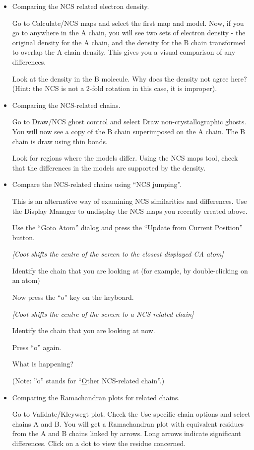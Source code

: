 \documentclass{article}
\begin{document}
\begin{itemize}
\item Comparing the NCS related electron density.

Go to \textsf{Calculate/NCS maps} and select the first map and
model. Now, if you go to anywhere in the A chain, you will see two
sets of electron density - the original density for the A chain, and
the density for the B chain transformed to overlap the A chain
density. This gives you a visual comparison of any differences.

Look at the density in the B molecule. Why does the density not agree
here? (Hint: the NCS is not a 2-fold rotation in this case, it is
improper).

\item Comparing the NCS-related chains.

  Go to \textsf{Draw/NCS ghost control} and select \textsf{Draw
    non-crystallographic ghosts}. You will now see a copy of the B
  chain superimposed on the A chain. The B chain is draw using thin
  bonds.

  Look for regions where the models differ. Using the \textsf{NCS
    maps} tool, check that the differences in the models are supported
  by the density.

\item Compare the NCS-related chains using ``NCS jumping''.

  This is an alternative way of examining NCS similarities and
  differences.  Use the Display Manager to undisplay the NCS maps you
  recently created above.  

  Use the ``Goto Atom'' dialog and press the ``Update from Current
  Position'' button.  

  \textsl{ [Coot shifts the centre of the screen to the closest
    displayed CA atom]}

  Identify the chain that you are looking at (for example, by
  double-clicking on an atom)

  Now press the ``o'' key on the keyboard.

  \textsl{ [Coot shifts the centre of the screen to a NCS-related
    chain]}

  Identify the chain that you are looking at now.

  Press ``o'' again.

  What is happening?

  (Note: ''o'' stands for ``\underline{O}ther NCS-related chain''.)


\item Comparing the Ramachandran plots for related chains.

  Go to \textsf{Validate/Kleywegt plot}. Check the \textsf{Use
    specific chain} options and select chains A and B. You will get a
  Ramachandran plot with equivalent residues from the A and B chains
  linked by arrows. Long arrows indicate significant differences.
  Click on a dot to view the residue concerned.

\end{itemize}
\end{document}

